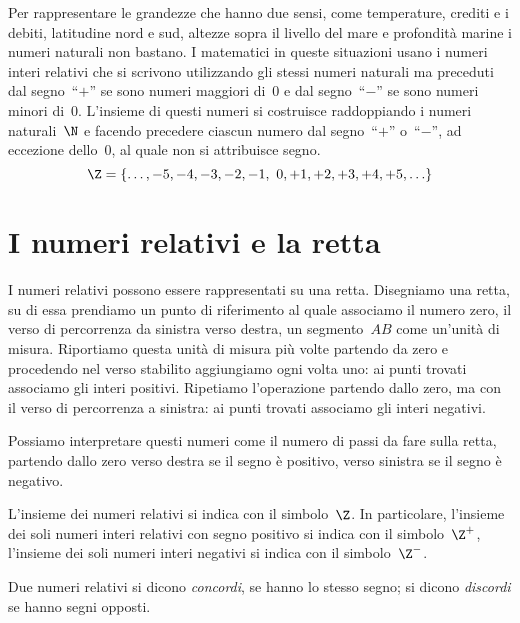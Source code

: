 Per rappresentare le grandezze che hanno due sensi, come temperature, crediti e 
i debiti, latitudine nord e sud,
altezze sopra il livello del mare e profondità marine i numeri naturali non 
bastano. I matematici in queste
situazioni usano i numeri interi relativi che si scrivono utilizzando gli stessi 
numeri naturali ma preceduti
dal segno~``\(+\)'' se sono numeri maggiori di~0 e dal segno~``\(-\)'' se sono 
numeri minori di~0. L'insieme di questi numeri
si costruisce raddoppiando i numeri naturali~\(\N\) e facendo precedere 
ciascun 
numero dal segno~``\(+\)'' o~``\(-\)'',
ad eccezione dello~0, al quale non si attribuisce segno.
\[ \Z=\lbrace\ldots,-5, -4, -3, -2, -1,~0, +1, +2, +3, +4, +5, 
\ldots\rbrace 
\]

\section{I numeri relativi e la retta}
\label{sec:int_retta}

I numeri relativi possono essere rappresentati su una retta. Disegniamo una 
retta, su di essa prendiamo
un punto di riferimento al quale associamo il numero zero, il verso di 
percorrenza da sinistra verso destra,
un segmento~\(AB\) come un'unità di misura. Riportiamo questa unità di 
misura più 
volte partendo da zero e
procedendo nel verso stabilito aggiungiamo ogni volta uno: ai punti trovati 
associamo gli interi positivi.
Ripetiamo l'operazione partendo dallo zero, ma con il verso di percorrenza 
a 
sinistra: ai punti trovati associamo
gli interi negativi.

\begin{center}
\rettainteri
%  
\end{center}

Possiamo interpretare questi numeri come il numero di passi da fare sulla 
retta, 
partendo dallo zero verso
destra se il segno è positivo, verso sinistra se il segno è negativo.

L'insieme dei numeri relativi si indica con il simbolo~\(\Z\). In 
particolare, 
l'insieme dei soli numeri interi relativi
con segno positivo si indica con il simbolo~\(\Z^+\),
l'insieme dei soli numeri interi negativi si indica con il 
simbolo~\(\Z^-\).

\begin{definizione}{}{}
 Due numeri relativi si dicono \emph{concordi}, se hanno lo stesso segno; 
si 
dicono \emph{discordi} se hanno
 segni opposti.
\end{definizione}

